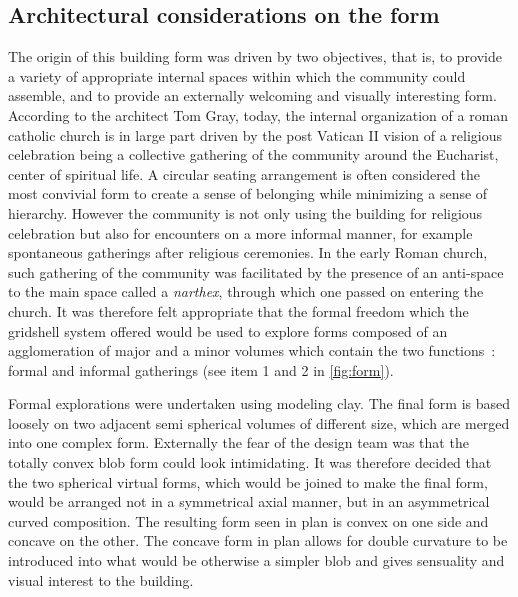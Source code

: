 \subsection{Architectural considerations on the form}
The origin of this building form was driven by two objectives, that is, to provide a variety of appropriate internal spaces within which the community could assemble, and to provide an externally welcoming and visually interesting form. According to the architect Tom Gray, today, the internal organization of a roman catholic church is in large part driven by the post Vatican II vision of a religious celebration being a collective gathering of the community around the Eucharist, center of spiritual life. A circular seating arrangement is often considered the most convivial form to create a sense of belonging while minimizing a sense of hierarchy. However the community is not only using the building for religious celebration but also for encounters on a more informal manner, for example spontaneous gatherings after religious ceremonies. In the early Roman church, such gathering of the community was facilitated by the presence of an anti-space to the main space called a \emph{narthex}, through which one passed on entering the church. It was therefore felt appropriate that the formal freedom which the gridshell system offered would be used to explore forms composed of an agglomeration of major and a minor volumes which contain the two functions~: formal and informal gatherings (see item 1 and 2 in \cref{fig:form}).

Formal explorations were undertaken using modeling clay. The final form is based loosely on two adjacent semi spherical volumes of different size, which are merged into one complex form. Externally the fear of the design team was that the totally convex blob form could look intimidating. It was therefore decided that the two spherical virtual forms, which would be joined to make the final form, would be arranged not in a symmetrical axial manner, but in an asymmetrical curved composition. The resulting form seen in plan is convex on one side and concave on the other. The concave form in plan allows for double curvature to be introduced into what would be otherwise a simpler blob and gives sensuality and visual interest to the building.

